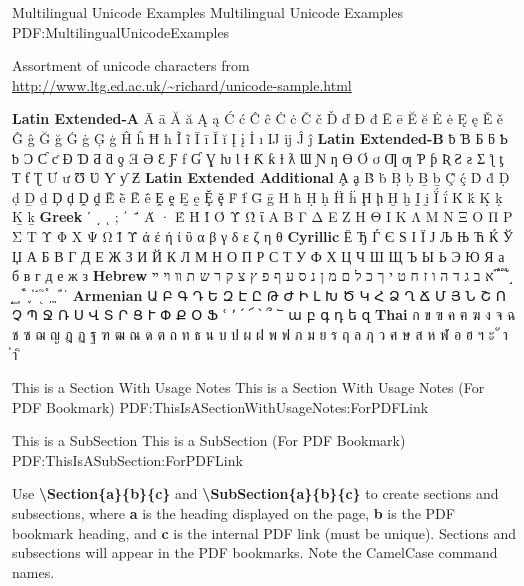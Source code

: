 \documentclass[letterpaper,MMMyyyy,nonstopmode]{simpleresumecv}
\newcommand{\Code}[1]{\mbox{\textbf{#1}}}
\newcommand{\CodeCommand}[1]{\mbox{\textbf{\textbackslash{#1}}}}
\begin{document}
\begin{Body}
{\Section
{Multilingual Unicode Examples}
{Multilingual Unicode Examples}
{PDF:MultilingualUnicodeExamples}

\BulletItem
Assortment of unicode characters from
\href{http://www.ltg.ed.ac.uk/~richard/unicode-sample.html}
{\url{http://www.ltg.ed.ac.uk/~richard/unicode-sample.html}}

\begin{Detail}
\Item
\textbf{Latin Extended-A}
Ā ā Ă ă Ą ą Ć ć Ĉ ĉ Ċ ċ Č č Ď ď Đ đ Ē ē Ĕ ĕ Ė ė Ę ę Ě ě Ĝ ĝ Ğ ğ Ġ ġ Ģ ģ Ĥ ĥ Ħ ħ Ĩ ĩ Ī ī Ĭ ĭ Į į İ ı Ĳ ĳ Ĵ ĵ
\textbf{Latin Extended-B}
ƀ Ɓ Ƃ ƃ Ƅ ƅ Ɔ Ƈ ƈ Ɖ Ɗ Ƌ ƌ ƍ Ǝ Ə Ɛ Ƒ ƒ Ɠ Ɣ ƕ Ɩ Ɨ Ƙ ƙ ƚ ƛ Ɯ Ɲ ƞ Ɵ Ơ ơ Ƣ ƣ Ƥ ƥ Ʀ Ƨ ƨ Ʃ ƪ ƫ Ƭ ƭ Ʈ Ư ư Ʊ Ʋ Ƴ ƴ Ƶ
\textbf{Latin Extended Additional}
Ḁ ḁ Ḃ ḃ Ḅ ḅ Ḇ ḇ Ḉ ḉ Ḋ ḋ Ḍ ḍ Ḏ ḏ Ḑ ḑ Ḓ ḓ Ḕ ḕ Ḗ ḗ Ḙ ḙ Ḛ ḛ Ḝ ḝ Ḟ ḟ Ḡ ḡ Ḣ ḣ Ḥ ḥ Ḧ ḧ Ḩ ḩ Ḫ ḫ Ḭ ḭ Ḯ ḯ Ḱ ḱ Ḳ ḳ Ḵ ḵ
\textbf{Greek}
ʹ ͵ ͺ ; ΄ ΅ Ά · Έ Ή Ί Ό Ύ Ώ ΐ Α Β Γ Δ Ε Ζ Η Θ Ι Κ Λ Μ Ν Ξ Ο Π Ρ Σ Τ Υ Φ Χ Ψ Ω Ϊ Ϋ ά έ ή ί ΰ α β γ δ ε ζ η θ
\textbf{Cyrillic}
Ё Ђ Ѓ Є Ѕ І Ї Ј Љ Њ Ћ Ќ Ў Џ А Б В Г Д Е Ж З И Й К Л М Н О П Р С Т У Ф Х Ц Ч Ш Щ Ъ Ы Ь Э Ю Я а б в г д е ж з
\textbf{Hebrew}
א ב ג ד ה ו ז ח ט י ך כ ל ם מ ן נ ס ע ף פ ץ צ ק ר ש ת װ ױ ײ ֝ ֞ ֟ ֠ ֡ ֣ ֤ ֥ ֦ ֧ ֨ ֩ ֪ ֫ ֬ ֭ ֮ ֯ ְ ֱ ֒ ֓ ֔
\textbf{Armenian}
{\UseSecondaryFont
Ա Բ Գ Դ Ե Զ Է Ը Թ Ժ Ի Լ Խ Ծ Կ Հ Ձ Ղ Ճ Մ Յ Ն Շ Ո Չ Պ Ջ Ռ Ս Վ Տ Ր Ց Ւ Փ Ք Օ Ֆ ՙ ՚ ՛ ՜ ՝ ՞ ՟ ա բ գ դ ե զ}
\textbf{Thai}
{\UseSecondaryFont
ก ข ฃ ค ฅ ฆ ง จ ฉ ช ซ ฌ ญ ฎ ฏ ฐ ฑ ฒ ณ ด ต ถ ท ธ น บ ป ผ ฝ พ ฟ ภ ม ย ร ฤ ล ฦ ว ศ ษ ส ห ฬ อ ฮ ฯ ะ ั า ำ ิ}
\end{Detail}

\newpage


\begingroup
\color{red}

\Section
{This is a\newline
Section\newline
With\newline
Usage Notes}
{This is a Section With Usage Notes (For PDF Bookmark)}
{PDF:ThisIsASectionWithUsageNotes:ForPDFLink}

\SubSection
{This is a SubSection}
{This is a SubSection (For PDF Bookmark)}
{PDF:ThisIsASubSection:ForPDFLink}

\Gap
\BulletItem
Use \CodeCommand{Section\{a\}\{b\}\{c\}} and
\CodeCommand{SubSection\{a\}\{b\}\{c\}}
to create sections and subsections, where
\Code{a} is the heading displayed on the page,
\Code{b} is the PDF bookmark heading, and
\Code{c} is the internal PDF link (must be unique).
Sections and subsections will appear in the PDF bookmarks.
Note the CamelCase command names.

}
\end{Body}
\end{document}
